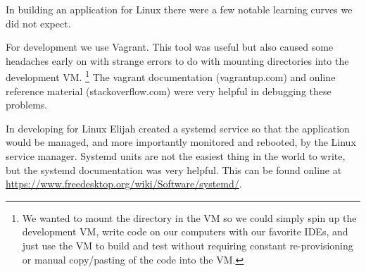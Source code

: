In building an application for Linux there were a few notable learning curves we did not expect.

For development we use Vagrant.
This tool was useful but also caused some headaches early on with strange errors to do with mounting directories into the development VM.
\footnote{We wanted to mount the directory in the VM so we could simply spin up the development VM, write code on our computers with our favorite IDEs, and just use the VM to build and test without requiring constant re-provisioning or manual copy/pasting of the code into the VM.}
The vagrant documentation (vagrantup.com) and online reference material (stackoverflow.com) were very helpful in debugging these problems.

In developing for Linux Elijah created a systemd service so that the application would be managed, and more importantly monitored and rebooted, by the Linux service manager.
Systemd units are not the easiest thing in the world to write, but the systemd documentation was very helpful.
This can be found online at \url{https://www.freedesktop.org/wiki/Software/systemd/}.
